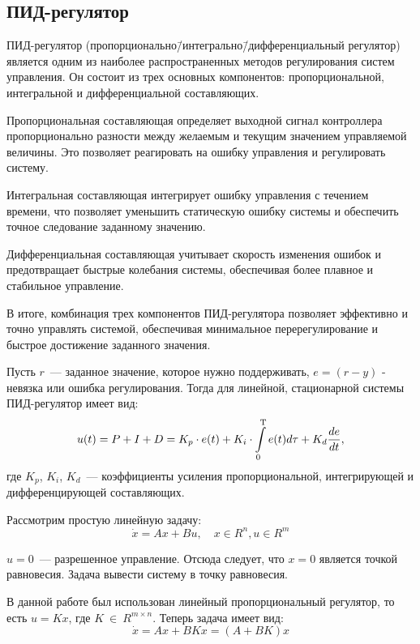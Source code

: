 \documentclass[a4paper,12pt]{article}
\numberwithin{figure}{subsubsection}
\begin{document}
\subsection{ПИД-регулятор}
\label{sec:regulator}

ПИД-регулятор (пропорционально\=/интегрально\=/дифференциальный регулятор) является одним из наиболее распространенных методов регулирования систем управления. Он состоит из трех основных компонентов: пропорциональной, интегральной и дифференциальной составляющих.

Пропорциональная составляющая определяет выходной сигнал контроллера пропорционально разности между желаемым и текущим значением управляемой величины. Это позволяет реагировать на ошибку управления и регулировать систему.

Интегральная составляющая интегрирует ошибку управления с течением времени, что позволяет уменьшить статическую ошибку системы и обеспечить точное следование заданному значению.

Дифференциальная составляющая учитывает скорость изменения ошибок и предотвращает быстрые колебания системы, обеспечивая более плавное и стабильное управление.

В итоге, комбинация трех компонентов ПИД-регулятора позволяет эффективно и точно управлять системой, обеспечивая минимальное перерегулирование и быстрое достижение заданного значения.

Пусть $r$~--- заданное значение, которое нужно поддерживать, $e = (r-y)$ - невязка или ошибка регулирования. Тогда для линейной, стационарной системы ПИД-регулятор имеет вид:
\begin{equation}
    u(t) = P + I + D = K_p\cdot e(t) + K_i \cdot \int\limits_0^\text{\textup{T}} e(t) d\tau + K_d \frac{de}{dt},
\end{equation} 
где $K_p$, $K_i$, $K_d$~--- коэффициенты усиления пропорциональной, интегрирующей и дифференцирующей составляющих.

Рассмотрим простую линейную задачу:
\begin{equation}\label{PID}
    \Dot{x} = Ax + Bu,\quad x \in R^n, u \in R^m
\end{equation}

$u = 0 $~--- разрешенное управление. Отсюда следует, что $x = 0$ является точкой равновесия. Задача вывести систему в точку равновесия.

В данной работе был использован линейный пропорциональный регулятор, то есть $u = Kx$, где $K~\in~R^{m\times n}$.
Теперь задача имеет вид:
\begin{equation}\label{PID_lin}
    \Dot{x} = Ax + BKx = (A+BK)x
\end{equation}
\end{document}
